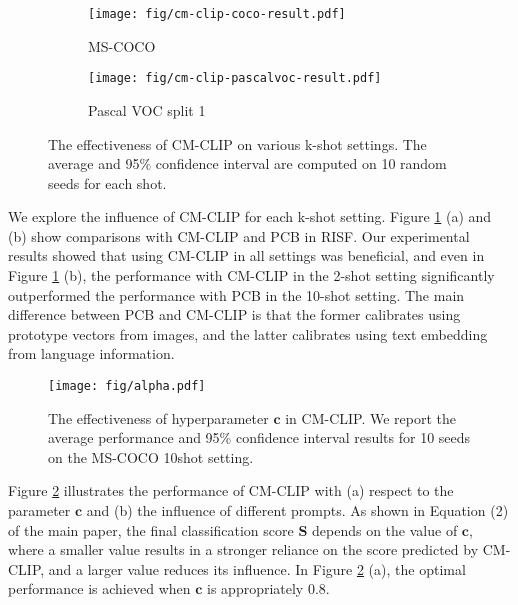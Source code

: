 \documentclass{article}
\begin{document}
\begin{figure}[h]
    \centering
    \begin{subfigure}[]{0.48\textwidth}
    \texttt{[image: fig/cm-clip-coco-result.pdf]}
    \caption{MS-COCO}
    \end{subfigure}
    \begin{subfigure}[]{0.48\textwidth}
    \texttt{[image: fig/cm-clip-pascalvoc-result.pdf]}
    \caption{Pascal VOC split 1}
    \end{subfigure}
    \caption{The effectiveness of CM-CLIP on various k-shot settings.
    The average and 95$\%$ confidence interval are computed on 10 random seeds for each shot.}
    \label{fig:cm-clip-result}
\end{figure}

We explore the influence of CM-CLIP for each k-shot setting. 
Figure \ref{fig:cm-clip-result} (a) and (b) show comparisons with CM-CLIP and PCB in RISF. 
Our experimental results showed that using CM-CLIP in all settings was beneficial, and even in Figure \ref{fig:cm-clip-result} (b), the performance with CM-CLIP in the 2-shot setting significantly outperformed the performance with PCB in the 10-shot setting. 
The main difference between PCB and CM-CLIP is that the former calibrates using prototype vectors from images, and the latter calibrates using text embedding from language information.

\begin{figure}[h]
    \centering
    \texttt{[image: fig/alpha.pdf]}
    \caption{The effectiveness of hyperparameter $\mathbf{c}$ in CM-CLIP. We report the average performance and 95\% confidence interval results for 10 seeds on the MS-COCO 10shot setting.}
\label{fig:cmclip}
\end{figure}

Figure \ref{fig:cmclip} illustrates the performance of CM-CLIP with (a) respect to the parameter $\mathbf{c}$ and (b) the influence of different prompts.
As shown in Equation (2) of the main paper, the final classification score $\mathbf{S}$ depends on the value of $\mathbf{c}$, where a smaller value results in a stronger reliance on the score predicted by CM-CLIP, and a larger value reduces its influence.
In Figure \ref{fig:cmclip} (a), the optimal performance is achieved when $\mathbf{c}$ is appropriately 0.8.
\end{document}
